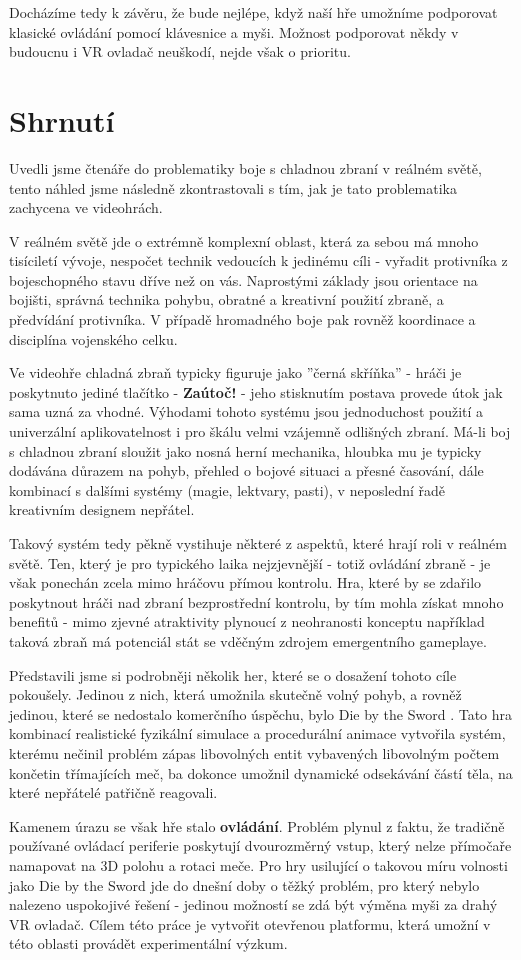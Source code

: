 Docházíme tedy k závěru, že bude nejlépe, když naší hře umožníme podporovat klasické ovládání pomocí klávesnice a myši. Možnost podporovat někdy v budoucnu i \acs{VR} ovladač neuškodí, nejde však o prioritu.

\section{Shrnutí}

Uvedli jsme čtenáře do problematiky boje s chladnou zbraní v reálném světě, tento náhled jsme následně zkontrastovali s tím, jak je tato problematika zachycena ve videohrách.

V reálném světě jde o extrémně komplexní oblast, která za sebou má mnoho tisíciletí vývoje, nespočet technik vedoucích k jedinému cíli - vyřadit protivníka z bojeschopného stavu dříve než on vás. Naprostými základy jsou orientace na bojišti, správná technika pohybu, obratné a kreativní použití zbraně, a předvídání protivníka. V případě hromadného boje pak rovněž koordinace a disciplína vojenského celku. 

Ve videohře chladná zbraň typicky figuruje jako ''černá skříňka'' - hráči je poskytnuto jediné tlačítko - \textbf{Zaútoč!} - jeho stisknutím postava provede útok jak sama uzná za vhodné. Výhodami tohoto systému jsou jednoduchost použití a univerzální aplikovatelnost i pro škálu velmi vzájemně odlišných zbraní. Má-li boj s chladnou zbraní sloužit jako nosná herní mechanika, hloubka mu je typicky dodávána důrazem na pohyb, přehled o bojové situaci a přesné časování, dále kombinací s dalšími systémy (magie, lektvary, pasti), v neposlední řadě kreativním designem nepřátel.

Takový systém tedy pěkně vystihuje některé z aspektů, které hrají roli v reálném světě. Ten, který je pro typického laika nejzjevnější - totiž ovládání zbraně - je však ponechán zcela mimo hráčovu přímou kontrolu. Hra, které by se zdařilo poskytnout hráči nad zbraní bezprostřední kontrolu, by tím mohla získat mnoho benefitů - mimo zjevné atraktivity plynoucí z neohranosti konceptu například taková zbraň má potenciál stát se vděčným zdrojem emergentního gameplaye.

Představili jsme si podrobněji několik her, které se o dosažení tohoto cíle pokoušely. Jedinou z nich, která umožnila skutečně volný pohyb, a rovněž jedinou, které se nedostalo komerčního úspěchu, bylo Die by the Sword \cite{DieByTheSword}. Tato hra kombinací realistické fyzikální simulace a procedurální animace vytvořila systém, kterému nečinil problém zápas libovolných entit vybavených libovolným počtem končetin třímajících meč, ba dokonce umožnil dynamické odsekávání částí těla, na které nepřátelé patřičně reagovali. 

Kamenem úrazu se však hře stalo \textbf{ovládání}. Problém plynul z faktu, že tradičně používané ovládací periferie poskytují dvourozměrný vstup, který nelze přímočaře namapovat na 3D polohu a rotaci meče. Pro hry usilující o takovou míru volnosti jako Die by the Sword jde do dnešní doby o těžký problém, pro který nebylo nalezeno uspokojivé řešení - jedinou možností se zdá být výměna myši za drahý \acs{VR} ovladač. Cílem této práce je vytvořit otevřenou platformu, která umožní v této oblasti provádět experimentální výzkum.
